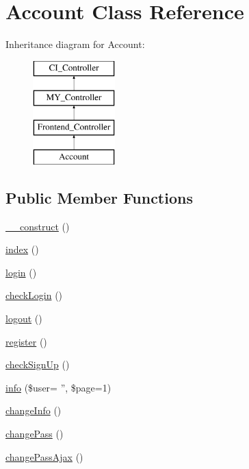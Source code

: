 \hypertarget{class_account}{\section{Account Class Reference}
\label{class_account}
}
Inheritance diagram for Account\-:\begin{figure}[H]
\begin{center}
\leavevmode
\includegraphics[height=4.000000cm]{class_account}
\end{center}
\end{figure}
\subsection*{Public Member Functions}
\begin{DoxyCompactItemize}
\item 
\hyperlink{class_account_a095c5d389db211932136b53f25f39685}{\-\_\-\-\_\-construct} ()
\item 
\hyperlink{class_account_a149eb92716c1084a935e04a8d95f7347}{index} ()
\item 
\hyperlink{class_account_aa311da27ba5706f5710cea7706c8eae1}{login} ()
\item 
\hyperlink{class_account_ab8e90adf3e4b15eea283c4ea450a4288}{check\-Login} ()
\item 
\hyperlink{class_account_a082405d89acd6835c3a7c7a08a7adbab}{logout} ()
\item 
\hyperlink{class_account_acc294a6cc8e69743746820e3d15e3f78}{register} ()
\item 
\hyperlink{class_account_a75c5d0ba8cf46e01803fe73377c0b568}{check\-Sign\-Up} ()
\item 
\hyperlink{class_account_a40cddf2c3aea991cb779c7f3fd6a7686}{info} (\$user= '', \$page=1)
\item 
\hyperlink{class_account_a5ade88a6ff0b0fa866339dd9fcf86d4a}{change\-Info} ()
\item 
\hyperlink{class_account_a01aa29b5aadaccb912fc21772a3b0154}{change\-Pass} ()
\item 
\hyperlink{class_account_a47ffb5f0d2928b065a2380d697178e72}{change\-Pass\-Ajax} ()
\end{DoxyCompactItemize}
